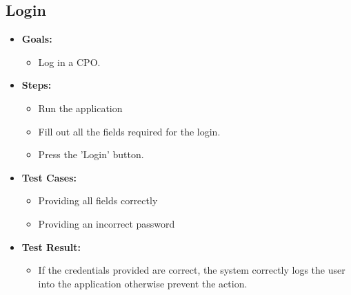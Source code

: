 \documentclass{Configuration_Files/PoliMi3i_thesis}
\begin{document}
\subsection{Login}
\begin{itemize}
    \item\textbf{Goals:}
        \begin{itemize}
            \item Log in a CPO.
       \end{itemize}
    \item \textbf{Steps:}
        \begin{itemize}
            \item Run the application 
            \item Fill out all the fields required for the login. 
            \item Press the 'Login' button. 
        \end{itemize}
    \item \textbf{Test Cases:}
        \begin{itemize}
            \item Providing all fields correctly
            \item Providing an incorrect password
        \end{itemize}
    \item\textbf{Test Result:}
        \begin{itemize}
            \item If the credentials provided are correct, the system correctly logs the user into the application otherwise prevent the action.
        \end{itemize}
\end{itemize}
\end{document}
